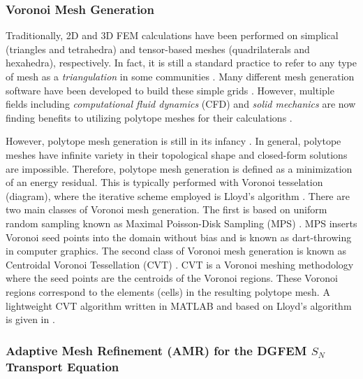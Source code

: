 \subsubsection{Voronoi Mesh Generation}
\label{sec::Intro_Past_Polytopes_Voronoi}

Traditionally, 2D and 3D FEM calculations have been performed on simplical (triangles and tetrahedra) and tensor-based meshes (quadrilaterals and hexahedra), respectively. In fact, it is still a standard practice to refer to any type of mesh as a {\em triangulation} in some communities \cite{ern2013theory}. Many different mesh generation software have been developed to build these simple grids \cite{shewchuk1996triangle,shewchuk2002delaunay,si2015tetgen,geuzaine2009gmsh}. However, multiple fields including {\em computational fluid dynamics} (CFD) and {\em solid mechanics} are now finding benefits to utilizing polytope meshes for their calculations \cite{ref::star_CCM,yip2005automated}.

However, polytope mesh generation is still in its infancy \cite{yip2005automated,sieger2010optimizing,ebeida2011uniform}. In general, polytope meshes have infinite variety in their topological shape and closed-form solutions are impossible. Therefore, polytope mesh generation is defined as a minimization of an energy residual. This is typically performed with Voronoi tesselation (diagram), where the iterative scheme employed is Lloyd's algorithm \cite{lloyd1982least,linde1980algorithm}. There are two main classes of Voronoi mesh generation. The first is based on uniform random sampling known as Maximal Poisson-Disk Sampling (MPS) \cite{ebeida2011uniform,ebeida2011efficient,ebeida2012simple}. MPS inserts Voronoi seed points into the domain without bias and is known as dart-throwing in computer graphics. The second class of Voronoi mesh generation is known as Centroidal Voronoi Tessellation (CVT) \cite{du1999centroidal,valette2004approximated}. CVT is a Voronoi meshing methodology where the seed points are the centroids of the Voronoi regions. These Voronoi regions correspond to the elements (cells) in the resulting polytope mesh. A lightweight CVT algorithm written in MATLAB and based on Lloyd's algorithm is given in \cite{talischi2012polymesher}.

\subsubsection{Adaptive Mesh Refinement (AMR) for the DGFEM $S_N$ Transport Equation}
\label{sec::Intro_Past_Polytopes_AMR}

